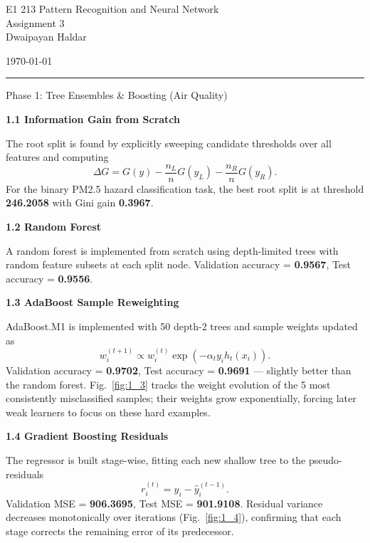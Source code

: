 \documentclass[11pt,a4paper,onecolumn]{exam}
\newcommand{\questionheader}[1]{%
  \begin{tcolorbox}[
    enhanced,
    colback=black,
    coltext=white,
    boxrule=0pt,
    fontupper=\Large\bfseries,
    arc=4mm
  ]
  #1
  \end{tcolorbox}%
}
\begin{document}
\begingroup
    \centering
    \LARGE E1 213 Pattern Recognition and Neural Network\\
    \LARGE Assignment 3\\[0.5em]
    \large Dwaipayan Haldar\par
    \large \today\\[0.5em]
\endgroup
\noindent\rule{\textwidth}{0.5pt}
\printanswers
\renewcommand{\solutiontitle}{\noindent\textbf{Ans:}\enspace}

\questionheader{Phase 1: Tree Ensembles \& Boosting (Air Quality)}

\textbf{1.1 Information Gain from Scratch}
\begin{solution}
The root split is found by explicitly sweeping candidate thresholds over all features and computing
\[
\Delta G = G(y)-\frac{n_L}{n}G(y_L)-\frac{n_R}{n}G(y_R).
\]
For the binary PM2.5 hazard classification task, the best root split is at threshold \textbf{246.2058} with Gini gain \textbf{0.3967}.
\end{solution}

\textbf{1.2 Random Forest}
\begin{solution}
A random forest is implemented from scratch using depth-limited trees with random feature subsets at each split node. Validation accuracy = \textbf{0.9567}, Test accuracy = \textbf{0.9556}.
\end{solution}

\textbf{1.3 AdaBoost Sample Reweighting}
\begin{solution}
AdaBoost.M1 is implemented with 50 depth-2 trees and sample weights updated as
\[
w_i^{(t+1)} \propto w_i^{(t)} \exp(-\alpha_t y_i h_t(x_i)).
\]
Validation accuracy = \textbf{0.9702}, Test accuracy = \textbf{0.9691} — slightly better than the random forest. Fig.~\ref{fig:1_3} tracks the weight evolution of the 5 most consistently misclassified samples; their weights grow exponentially, forcing later weak learners to focus on these hard examples.
\end{solution}

\textbf{1.4 Gradient Boosting Residuals}
\begin{solution}
The regressor is built stage-wise, fitting each new shallow tree to the pseudo-residuals
\[
r_i^{(t)} = y_i - \hat{y}_i^{(t-1)}.
\]
Validation MSE = \textbf{906.3695}, Test MSE = \textbf{901.9108}. Residual variance decreases monotonically over iterations (Fig.~\ref{fig:1_4}), confirming that each stage corrects the remaining error of its predecessor.
\end{solution}
\end{document}

